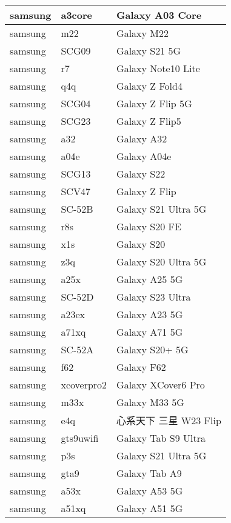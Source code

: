 \begin{tabularx}{\linewidth}{|l|X|X|}
        samsung & a3core & Galaxy A03 Core \\ \hline
        samsung & m22 & Galaxy M22 \\ \hline
        samsung & SCG09 & Galaxy S21 5G \\ \hline
        samsung & r7 & Galaxy Note10 Lite \\ \hline
        samsung & q4q & Galaxy Z Fold4 \\ \hline
        samsung & SCG04 & Galaxy Z Flip 5G \\ \hline
        samsung & SCG23 & Galaxy Z Flip5 \\ \hline
        samsung & a32 & Galaxy A32 \\ \hline
        samsung & a04e & Galaxy A04e \\ \hline
        samsung & SCG13 & Galaxy S22 \\ \hline
        samsung & SCV47 & Galaxy Z Flip \\ \hline
        samsung & SC-52B & Galaxy S21 Ultra 5G \\ \hline
        samsung & r8s & Galaxy S20 FE \\ \hline
        samsung & x1s & Galaxy S20 \\ \hline
        samsung & z3q & Galaxy S20 Ultra 5G \\ \hline
        samsung & a25x & Galaxy A25 5G \\ \hline
        samsung & SC-52D & Galaxy S23 Ultra \\ \hline
        samsung & a23ex & Galaxy A23 5G \\ \hline
        samsung & a71xq & Galaxy A71 5G \\ \hline
        samsung & SC-52A & Galaxy S20+ 5G \\ \hline
        samsung & f62 & Galaxy F62 \\ \hline
        samsung & xcoverpro2 & Galaxy XCover6 Pro \\ \hline
        samsung & m33x & Galaxy M33 5G \\ \hline
        samsung & e4q & 心系天下 三星 W23 Flip \\ \hline
        samsung & gts9uwifi & Galaxy Tab S9 Ultra \\ \hline
        samsung & p3s & Galaxy S21 Ultra 5G \\ \hline
        samsung & gta9 & Galaxy Tab A9 \\ \hline
        samsung & a53x & Galaxy A53 5G \\ \hline
        samsung & a51xq & Galaxy A51 5G \\ \hline

\end{tabularx}
